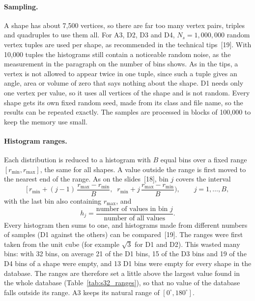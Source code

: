 \documentclass[10pt,a4paper]{article}
\begin{document}
\paragraph{Sampling.}
A shape has about 7,500 vertices, so there are far too many vertex pairs, triples and quadruples to use them all. For A3, D2, D3
and D4, $N_s=1{,}000{,}000$ random vertex tuples are used per shape, as recommended in the technical tips~[19]. With 10,000
tuples the histograms still contain a noticeable random noise, as the measurement in the paragraph on the number of bins shows. As in the tips, a vertex is not allowed to appear twice in one tuple, since such a tuple gives an angle,
area or volume of zero that says nothing about the shape. D1 needs only one vertex per value, so it uses all vertices of the
shape and is not random. Every shape gets its own fixed random seed, made from its class and file name, so the results can be
repeated exactly. The samples are processed in blocks of 100,000 to keep the memory use small.

\paragraph{Histogram ranges.}
Each distribution is reduced to a histogram with $B$ equal bins over a fixed range $[r_{\min},r_{\max}]$, the same for all
shapes. A value outside the range is first moved to the nearest end of the range. As on the slides~[18], bin $j$ covers the
interval
\begin{equation}
\Big[\,r_{\min}+(j-1)\,\frac{r_{\max}-r_{\min}}{B},\;\; r_{\min}+j\,\frac{r_{\max}-r_{\min}}{B}\Big),\qquad j=1,\ldots,B,
\label{eq:s32_bins}
\end{equation}
with the last bin also containing $r_{\max}$, and
\begin{equation}
h_j=\frac{\text{number of values in bin } j}{\text{number of all values}} .
\label{eq:s32_histogram}
\end{equation}
Every histogram then sums to one, and histograms made from different numbers of samples (D1 against the others) can be
compared~[19]. The ranges were first taken from the unit cube (for example $\sqrt3$ for D1 and
D2). This wasted many bins: with 32 bins, on average 21 of the D1 bins, 15 of the D3 bins and 19 of the D4 bins of a shape were
empty, and 13 D1 bins were empty for every shape in the database.
The ranges are therefore set a little above the largest value found in the whole database
(Table~\ref{tab:s32_ranges}), so that no value of the database falls outside its range. A3 keeps its natural range of
$[0^\circ,180^\circ]$.
\end{document}
